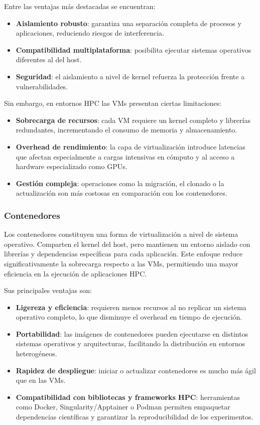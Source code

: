 Entre las ventajas más destacadas se encuentran:
\begin{itemize}
    \item \textbf{Aislamiento robusto}: garantiza una separación completa de procesos y aplicaciones, reduciendo riesgos de interferencia.
    \item \textbf{Compatibilidad multiplataforma}: posibilita ejecutar sistemas operativos diferentes al del host.
    \item \textbf{Seguridad}: el aislamiento a nivel de kernel refuerza la protección frente a vulnerabilidades.
\end{itemize}

Sin embargo, en entornos HPC las VMs presentan ciertas limitaciones:
\begin{itemize}
    \item \textbf{Sobrecarga de recursos}: cada VM requiere un kernel completo y librerías redundantes, incrementando el consumo de memoria y almacenamiento.
    \item \textbf{Overhead de rendimiento}: la capa de virtualización introduce latencias que afectan especialmente a cargas intensivas en cómputo y al acceso a hardware especializado como GPUs.
    \item \textbf{Gestión compleja}: operaciones como la migración, el clonado o la actualización son más costosas en comparación con los contenedores.
\end{itemize}

\subsubsection{Contenedores}

Los contenedores constituyen una forma de virtualización a nivel de sistema operativo. Comparten el kernel del host, pero mantienen un entorno aislado con librerías y dependencias específicas para cada aplicación. Este enfoque reduce significativamente la sobrecarga respecto a las VMs, permitiendo una mayor eficiencia en la ejecución de aplicaciones HPC.

Sus principales ventajas son:

\begin{itemize}
    \item \textbf{Ligereza y eficiencia}: requieren menos recursos al no replicar un sistema operativo completo, lo que disminuye el overhead en tiempo de ejecución.
    \item \textbf{Portabilidad}: las imágenes de contenedores pueden ejecutarse en distintos sistemas operativos y arquitecturas, facilitando la distribución en entornos heterogéneos.
    \item \textbf{Rapidez de despliegue}: iniciar o actualizar contenedores es mucho más ágil que en las VMs.
    \item \textbf{Compatibilidad con bibliotecas y frameworks HPC}: herramientas como Docker, Singularity/Apptainer o Podman permiten empaquetar dependencias científicas y garantizar la reproducibilidad de los experimentos.
\end{itemize}

